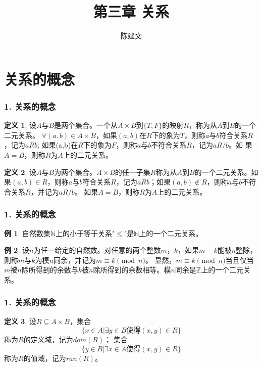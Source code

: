 \documentclass{beamer}
\begin{document}
\begin{CJK*}{UTF8}{gbsn}

\newtheorem{Thm}{定理}[section]
\newtheorem{Cor}{推论}[section]
\theoremstyle{definition}
\newtheorem{Def}{定义}[section]
\theoremstyle{example}
\newtheorem{Ex}{例}[section]
\date{}
\author{陈建文}

\title{第三章 关系}
\begin{frame}
  \titlepage
\end{frame}  
\section{关系的概念}
\begin{frame}
  \frametitle{1. 关系的概念}
  
  \begin{Def}\justifying\let\raggedright\justifying
    设$A$与$B$是两个集合。一个从$A\times B$到$\{T,F\}$的映射$R$，称为从$A$到$B$的一个\alert{二元关系}。
    $\forall (a,b) \in A \times B$，如果$(a,b)$在$R$下的象为$T$，则称$a$与$b$符合关系$R$，记为$aRb$;
    如果(a,b)在$R$下的象为$F$，则称$a$与$b$不符合关系$R$，记为$aR\!\!\! / b$。如
    果$A=B$，则称$R$为$A$上的二元关系。
  \end{Def}
  \pause
  \begin{Def}\justifying\let\raggedright\justifying
    设$A$与$B$为两个集合。$A\times B$的任一子集$R$称为从$A$到$B$的一个\alert{二元关系}。如果$(a,b)\in R$，则称$a$与$b$符合关系$R$，记为$aRb$；如果$(a,b) \notin R$，则称$a$与$b$不符合关系$R$，并记为$aR\!\!\! / b$。
    如果$A=B$，则称$R$为$A$上的二元关系。
  \end{Def}
\end{frame}

\begin{frame}
  \frametitle{1. 关系的概念}
  \begin{Ex}
    自然数集$\mathbb{N}$上的小于等于关系"$\leq$"是$\mathbb{N}$上的一个二元关系。
  \end{Ex}\pause
  \begin{Ex}\justifying\let\raggedright\justifying
    设$n$为任一给定的自然数。对任意的两个整数$m$，$k$，如果$m-k$能被$n$整除，则称$m$与$k$为模$n$同余，并记为$m\equiv k \pmod{n}$。
    显然，$m\equiv k \pmod{n}$当且仅当$m$被$n$除所得到的余数与$k$被$n$除所得到的余数相等。模$n$同余是$\mathbb{Z}$上的一个二元关系。
  \end{Ex}
\end{frame}

\begin{frame}
  \frametitle{1. 关系的概念}
  \begin{Def}
    设$R \subseteq A \times B$，集合
    \[\{x \in A | \exists y \in B \text{使得} (x,y) \in R\}\]
    称为$R$的\alert{定义域}，记为$dom(R)$； 集合
    \[\{y \in B | \exists x \in A \text{使得} (x,y) \in R\}\]
    称为$R$的\alert{值域}，记为$ran(R)$。
  \end{Def}
\end{frame}




\end{CJK*}
\end{document}
